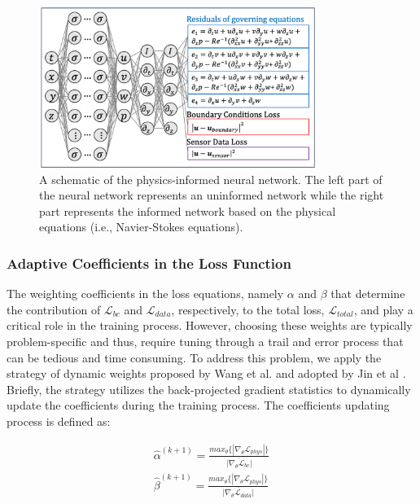 \documentclass[times,twocolumn,final]{elsarticle}
\begin{document}
{%
\begin{figure}[!t]
\centering
\includegraphics[width=0.8\textwidth]{./Figures/Figure_Methods_0}
\caption{A schematic of the physics-informed neural network. The left part of the neural network represents an uninformed network while the right part represents the informed network based on the physical equations (i.e., Navier-Stokes equations).}
\label{fig:Results_0}
\end{figure}

\subsubsection{Adaptive Coefficients in the Loss Function}
The weighting coefficients in the loss equations, namely $\alpha$ and $\beta$ that determine the contribution of $\mathcal{L}_{bc}$ and $\mathcal{L}_{data}$, respectively, to the total loss, $\mathcal{L}_{total}$, and play a critical role in the training process. However, choosing these weights are typically problem-specific and thus, require tuning through a trail and error process that can be tedious and time consuming. To address this problem, we apply the strategy of dynamic weights proposed by Wang et al. \citep{Wang2020_PINNs} and adopted by Jin et al \citep{Jin2021_PINNs}. Briefly, the strategy utilizes the back-projected gradient statistics to dynamically update the coefficients during the training process. The coefficients updating process is defined as:

\begin{equation}
\begin{split}
\hat{\alpha}^{(k+1)} = \frac{ max_{\theta}\{|\nabla_\theta\mathcal{L}_{phys}|\}}{\overline{|\nabla_\theta\mathcal{L}_{bc}|}} 
\\[5pt]
\hat{\beta}^{(k+1)} = \frac{ max_{\theta}\{|\nabla_\theta\mathcal{L}_{phys}|\}}{\overline{|\nabla_\theta\mathcal{L}_{data}|}} 
\end{split}
\end{equation}

}
\end{document}
